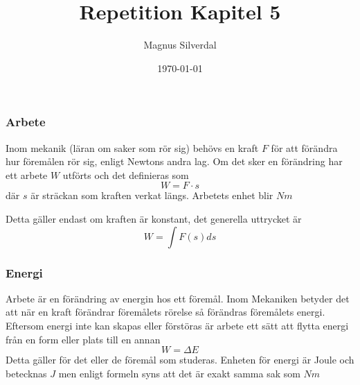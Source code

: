 \documentclass[11pt]{beamer}
\title{Repetition Kapitel 5}
\author{Magnus Silverdal}
\institute{NTI Gymnasiet}
\date{\today}
\begin{document}
    \frame{\titlepage}

    \begin{frame}
        \frametitle{Arbete}
        Inom mekanik (läran om saker som rör sig) behövs en kraft $F$ för att förändra hur föremålen rör sig, enligt Newtons andra lag.
        Om det sker en förändring har ett arbete $W$ utförts och det definieras som
        \begin{equation}
            W = F \cdot s
        \end{equation}
        där $s$ är sträckan som kraften verkat längs. Arbetets enhet blir $Nm$

        \vspace{10}
        Detta gäller endast om kraften är konstant, det generella uttrycket är
        \begin{equation}
            W = \int F(s) ds
        \end{equation}

    \end{frame}

    \begin{frame}
        \frametitle{Energi}
        Arbete är en förändring av energin hos ett föremål. Inom Mekaniken betyder det att när en kraft förändrar
        föremålets rörelse så förändras föremålets energi. Eftersom energi inte kan skapas eller förstöras är arbete
        ett sätt att flytta energi från en form eller plats till en annan
        \begin{equation}
            W = \Delta E
        \end{equation}
        Detta gäller för det eller de föremål som studeras. Enheten för energi är Joule och betecknas $J$ men enligt
        formeln syns att det är exakt samma sak som $Nm$
    \end{frame}
\end{document}
